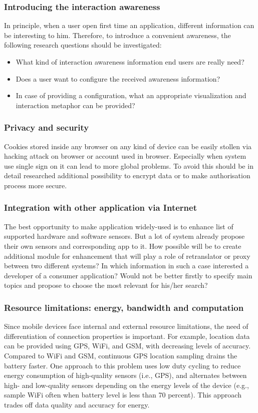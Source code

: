 		\subsubsection {Introducing the interaction awareness}
		In principle, when a user open first time an application, different information can be interesting to him. Therefore, to introduce a convenient awareness, the following research questions should be investigated:
		 \begin{itemize}
		\item What kind of interaction awareness information end users are really need?
		\item Does a user want to configure the received awareness information?
		\item In case of providing a configuration, what an appropriate visualization and interaction metaphor can be provided? 
		\end{itemize}

		\subsubsection{Privacy and security}
		Cookies stored inside any browser on any kind of device can be easily stollen via hacking attack on browser or account used in browser. Especially when system use single sign on it can lead to more global problems. To avoid this should be in detail researched additional possibility to encrypt data or to make authorisation process more secure.

		\subsubsection {Integration with other application via Internet}
		 The best opportunity to make application widely-used is to enhance list of supported hardware and software sensors. But a lot of system already propose their own sensors and corresponding app to it. How possible will be to create additional module for enhancement that will play a role of retranslator or proxy between two different systems? In which information in such a case interested a developer of a consumer application? Would not be better firstly to specify main topics and propose to choose the most relevant for his/her search?

		\subsubsection {Resource limitations: energy, bandwidth and computation}
		Since mobile devices face internal and external resource limitations, the need of differentiation of connection properties is important. For example, location data can be provided using GPS, WiFi, and GSM, with decreasing levels of accuracy. Compared to WiFi and GSM, continuous GPS location sampling drains the battery faster. One approach to this problem uses low duty cycling to reduce energy consumption of high-quality sensors (i.e., GPS), and alternates between high- and low-quality sensors depending on the energy levels of the device (e.g., sample WiFi often when battery level is less than 70 percent). This approach trades off data quality and accuracy for energy. 

